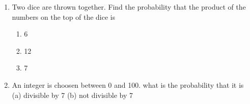 \begin{enumerate}[label=\thesection.\arabic*,ref=\thesection.\theenumi]
	\item Two dice are thrown together. Find the probability that the product of the numbers
on the top of the dice is
\begin{enumerate}
\item 6
\item 12
\item 7
\end{enumerate}
		\solution
		
	\item An integer is choosen between 0 and 100. what is the probability that it is \\
(a) divisible by 7  (b) not divisible by 7\\
		\solution
  		
\end{enumerate}
